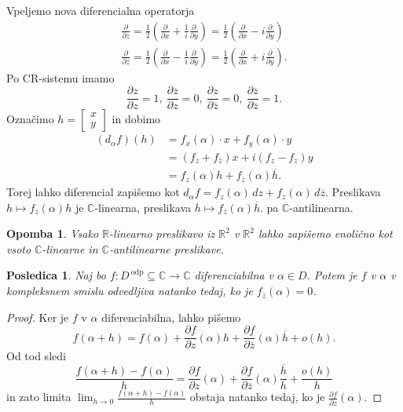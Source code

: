 \documentclass[10pt, a4paper]{article}
\newtheorem{posledica}[izr]{Posledica}
\newtheorem*{opomba}{Opomba}
\newenvironment{noticeC}{%
  \tcolorbox[%
  notitle,
  empty,
  enhanced,  %
  breakable,
  coltext=black, 
  fontupper=\rmfamily,
  parbox=false,
  noparskip,
  sharp corners,
  boxrule=-1pt,  %
  frame hidden,
  left=7pt,  %
  right=7pt,
  top=5pt,
  bottom=5pt,
  before skip=2.5ex plus 2pt,
  after skip=2.5ex plus 2pt,
  overlay unbroken and last={%
  },
  ]}
{\endtcolorbox}
\newenvironment{dokaz}%
  {\begin{noticeC}\begin{proof}}%
  {\end{proof}\end{noticeC}}
\newcommand{\R}{\mathbb {R}}
\newcommand{\C}{\mathbb {C}}
\begin{document}
Vpeljemo nova diferencialna operatorja
\begin{align*}
  \frac{\partial}{\partial z} = \frac{1}{2} \left(\frac{\partial}{\partial x} + \frac{1}{i} \frac{\partial}{\partial y}\right) = \frac{1}{2} \left(\frac{\partial}{\partial x} - i \frac{\partial}{\partial y}\right)\\
  \frac{\partial}{\partial \overline{z}} = \frac{1}{2} \left(\frac{\partial}{\partial x} - \frac{1}{i} \frac{\partial}{\partial y}\right) = \frac{1}{2} \left(\frac{\partial}{\partial x} + i \frac{\partial}{\partial y}\right).
\end{align*}
Po CR-sistemu imamo 
\begin{equation*}
  \frac{\partial z}{\partial z} = 1,\ \frac{\partial \overline{z}}{\partial z} = 0,\ \frac{\partial z}{\partial \overline{z}} = 0,\ \frac{\partial \overline{z}}{\partial \overline{z}} = 1.
\end{equation*}
Označimo $h = \begin{bmatrix}
  x \\ y
\end{bmatrix}$ in dobimo 
\begin{align*}
  (d_\alpha f)(h) &= f_x (\alpha) \cdot x + f_y (\alpha) \cdot y\\
  &= (f_z + f_{\overline{z}}) x + i (f_z - f_{\overline{z}}) y\\
  &= f_z (\alpha) h + f_{\overline{z}} (\alpha) \overline{h}.
\end{align*}
Torej lahko diferencial zapišemo kot 
$d_\alpha f = f_z (\alpha)\, dz + f_z (\alpha)\, d\overline{z}.$
Preslikava $h \mapsto f_z (\alpha) h$ je $\C$-linearna,
preslikava $h \mapsto f_{\overline{z}} (\alpha) \overline{h}$.
pa $\C$-antilinearna.

\begin{opomba}
  Vsako $\R$-linearno preslikavo iz $\R^2$ v $\R^2$
  lahko zapišemo enolično kot vsoto $\C$-linearne in $\C$-antilinearne preslikave.
\end{opomba}

\begin{posledica}
  Naj bo $f: D^{\ \text{odp}} \subseteq \C \to \C$ diferenciabilna v $\alpha \in D$.
  Potem je $f$ v $\alpha$ v kompleksnem smislu odvedljiva natanko tedaj, ko je $f_{\overline{z}} (\alpha) = 0$.
\end{posledica}

\begin{dokaz}
  Ker je $f$ v $\alpha$ diferenciabilna, lahko pišemo 
  $$f(\alpha + h) = f(\alpha) + \frac{\partial f}{\partial z} (\alpha) h + \frac{\partial f}{\partial \overline{z}} (\alpha) \overline{h} + o(h).$$
  Od tod sledi 
  $$\frac{f(\alpha + h) - f(\alpha)}{h} = \frac{\partial f}{\partial z} (\alpha) + \frac{\partial f}{\partial \overline{z}} (\alpha) \frac{\overline{h}}{h} + \frac{o(h)}{h}$$
  in zato limita $\lim_{h \to 0} \frac{f(\alpha + h) - f(\alpha)}{h}$ obstaja natanko tedaj, ko je $\frac{\partial f}{\partial z} (\alpha)$.
\end{dokaz}
\end{document}
